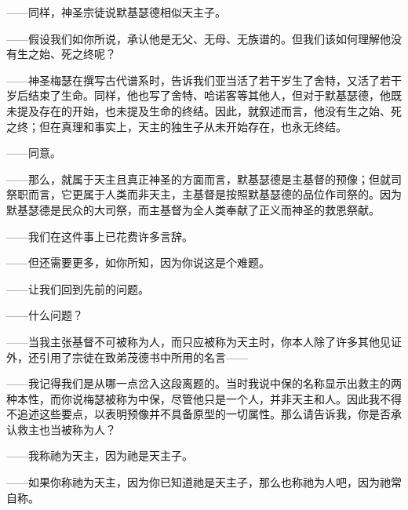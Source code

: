 ——同样，神圣宗徒说默基瑟德相似天主子。\par

——假设我们如你所说，承认他是无父、无母、无族谱的。但我们该如何理解他没有生之始、死之终呢？\par

——神圣梅瑟在撰写古代谱系时，告诉我们亚当活了若干岁生了舍特，又活了若干岁后结束了生命。同样，他也写了舍特、哈诺客等其他人，但对于默基瑟德，他既未提及存在的开始，也未提及生命的终结。因此，就叙述而言，他没有生之始、死之终；但在真理和事实上，天主的独生子从未开始存在，也永无终结。\par

——同意。\par

——那么，就属于天主且真正神圣的方面而言，默基瑟德是主基督的预像；但就司祭职而言，它更属于人类而非天主，主基督是按照默基瑟德的品位作司祭的。因为默基瑟德是民众的大司祭，而主基督为全人类奉献了正义而神圣的救恩祭献。\par

——我们在这件事上已花费许多言辞。\par

——但还需要更多，如你所知，因为你说这是个难题。\par

——让我们回到先前的问题。\par

——什么问题？\par

——当我主张基督不可被称为人，而只应被称为天主时，你本人除了许多其他见证外，还引用了宗徒在致弟茂德书中所用的名言——\par

——我记得我们是从哪一点岔入这段离题的。当时我说中保的名称显示出救主的两种本性，而你说梅瑟被称为中保，尽管他只是一个人，并非天主和人。因此我不得不追述这些要点，以表明预像并不具备原型的一切属性。那么请告诉我，你是否承认救主也当被称为人？\par

——我称祂为天主，因为祂是天主子。\par

——如果你称祂为天主，因为你已知道祂是天主子，那么也称祂为人吧，因为祂常自称。\par

